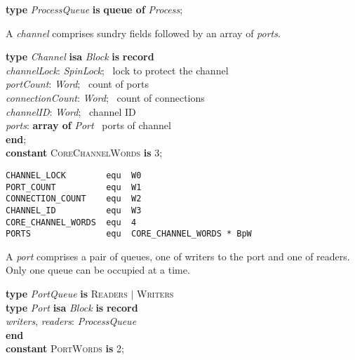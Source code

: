 \begin{tabbing}
\indents
\vb\>\textbf{type} \emph{ProcessQueue} \textbf{is} \textbf{queue of} \emph{Process};
\end{tabbing}


A \emph{channel} comprises sundry fields followed by an array of \emph{ports}.

\begin{tabbing}
\indents
\vb\>\textbf{type} \emph{Channel} \textbf{isa} \emph{Block} \textbf{is} \textbf{record}\\
\vb\>\>\emph{channelLock}: \emph{SpinLock};
   \>\>\>\>\>\>\>\> \rmk\ lock to protect the channel\\
\vb\>\>\emph{portCount}: \emph{Word};
   \>\>\>\>\>\>\>\> \rmk\ count of ports\\
\vb\>\>\emph{connectionCount}: \emph{Word};
   \>\>\>\>\>\>\>\> \rmk\ count of connections\\
\vb\>\>\emph{channelID}: \emph{Word};
   \>\>\>\>\>\>\>\> \rmk\ channel ID\\
\vb\>\>\emph{ports}: \textbf{array of} \emph{Port}
   \>\>\>\>\>\>\>\> \rmk\ ports of channel\\
\vb\>\textbf{end};\\
\vb\>\textbf{constant} \textsc{CoreChannelWords} \textbf{is} 3;
\end{tabbing}

{\small
\begin{verbatim}
CHANNEL_LOCK        equ  W0
PORT_COUNT          equ  W1
CONNECTION_COUNT    equ  W2
CHANNEL_ID          equ  W3
CORE_CHANNEL_WORDS  equ  4
PORTS               equ  CORE_CHANNEL_WORDS * BpW
\end{verbatim}}



A \emph{port} comprises a pair of queues, one of writers to the port and one of readers. Only one queue can be occupied at a time.

\begin{tabbing}
\indents
\vb\>\textbf{type} \emph{PortQueue} \textbf{is} \textsc{Readers} $|$ \textsc{Writers} \\
 \vb\>\textbf{type} \emph{Port} \textbf{isa} \emph{Block} \textbf{is} \textbf{record}\\
\vb\>\>\emph{writers}, \emph{readers}: \emph{ProcessQueue}\\
\vb\>\textbf{end}\\
\vb\>\textbf{constant} \textsc{PortWords} \textbf{is} 2;
\end{tabbing}

